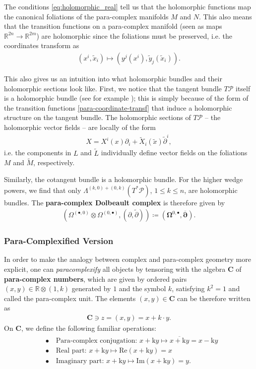 \documentclass[letterpaper,12pt]{article}
\newcommand{\RR}{\mathbb{R}}
\newcommand{\PS}{\mathcal{P}}
\newcommand{\p}{\partial}
\newcommand{\pt}{\tilde{\partial}}
\newcommand{\xt}{{\tilde{x}}}
\newcommand{\Lt}{{\tl{L}}}
\newcommand{\yt}{\tl{y}}
\newcommand{\kk}{\mathrm{k}}
\newcommand{\Mt}{\tl{M}}
\newcommand{\pd}{\overline{\bm{\p}}}
\def\tl{\tilde}
\theoremstyle{definition}
\theoremstyle{remark}
\theoremstyle{examples}
\begin{document}
The conditions \eqref{eq:holomorphic_real} tell us that the holomorphic functions map the canonical foliations of the para-complex manifolds $M$ and $N$. This also means that the transition functions on a para-complex manifold (seen as maps $\RR^{2n}\rightarrow \RR^{2m}$) are holomorphic since the foliations must be preserved, i.e. the coordinates transform as
\begin{align}\label{para-coordinate-transf}
(x^i,\xt_i)\mapsto (y^j(x^i),\yt_j(\xt_i)).
\end{align}

This also gives us an intuition into what holomorphic bundles and their holomorphic sections look like. First, we notice that the tangent bundle $T\PS$ itself is a holomorphic bundle (see for example \cite{Cortes:2003zd,Hu:2019zro}); this is simply because of the form of the transition functions \eqref{para-coordinate-transf} that induce a holomorphic structure on the tangent bundle. The holomorphic sections of $T\PS$ -- the holomorphic vector fields -- are locally of the form
\begin{align}\label{para-holo-vector}
X= X^i(x)\p_i+\tl{X}_i(\xt)\pt^i,
\end{align}
i.e. the components in $L$ and $\Lt$ individually define vector fields on the foliations $M$ and $\Mt$, respectively.  

Similarly, the cotangent bundle is a holomorphic bundle. For the higher wedge powers, we find that only $\Lambda^{(k,0)+(0,k)}(T^*\PS)$, $1\leq k\leq n$, are holomorphic bundles. The {\bf para-complex Dolbeault complex} is therefore given by
\begin{align}\label{para-dolbeault}
\left(\Omega^{(\bullet,0)}\otimes\Omega^{(0,\bullet)},(\p,\pt)\right)\coloneqq \left(\mathbf{\Omega}^{0,\bullet},\pd\right).
\end{align}

\subsubsection{Para-Complexified Version}
In order to make the analogy between complex and para-complex geometry more explicit, one can \textit{paracomplexify} all objects by tensoring with the algebra $\mathbf{C}$ of \textbf{para-complex numbers}, which are given by ordered pairs $(x,y)\in \mathbb{R}\otimes (1,k)$ generated by $1$ and the symbol $k$, satisfying $k^2=1$ and called the para-complex unit. The elements $(x,y)\in \mathbf{C}$ can be therefore written as
\begin{align*}
\mathbf{C} \ni z=(x,y)=x+k\cdot y.
\end{align*}
On $\mathbf{C}$, we define the following familiar operations:\begin{align}
\begin{aligned}
&\bullet\quad \text{Para-complex conjugation: }x+\kk y\mapsto \overline{x+\kk y}=x-\kk y\\
&\bullet\quad \text{Real part: } x+\kk y \mapsto \text{Re}(x+\kk y)=x\\
&\bullet\quad \text{Imaginary part: } x+\kk y \mapsto \text{Im}(x+\kk y)=y.
\end{aligned}
\end{align}
\end{document}
